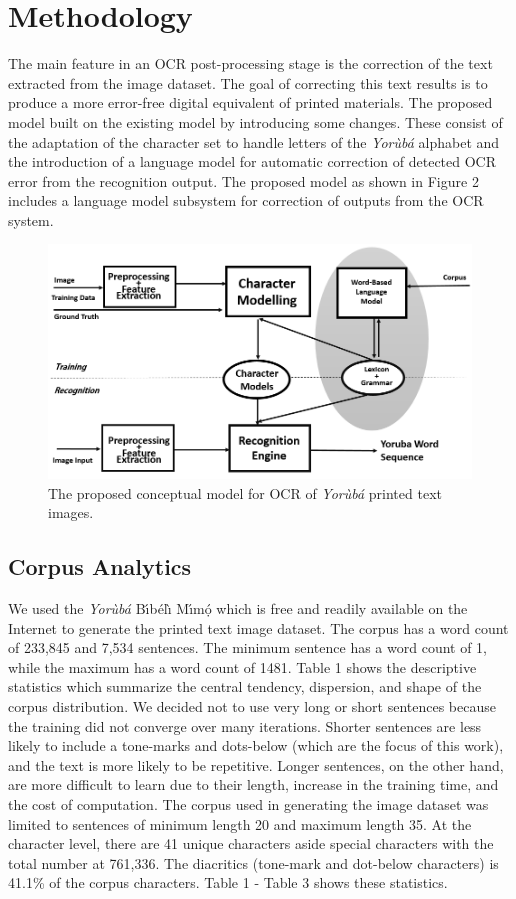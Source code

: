 \documentclass[review]{elsarticle}
\newcommand{\yor}{\textit{Yor\`ub\'a }}
\begin{document}
\section{Methodology}
The main feature in an OCR post-processing stage is the correction of the text extracted from the image dataset. The goal of correcting this text results is to produce a more error-free digital equivalent of printed materials. The proposed model built on the existing model by introducing some changes. These consist of the adaptation of the character set to handle letters of the \yor alphabet and the introduction of a language model for automatic correction of detected OCR error from the recognition output. The proposed model as shown in Figure 2 includes a language model subsystem for correction of outputs from the OCR system. 

\begin{figure}[h]
\centering
\includegraphics[width=0.8\linewidth, height=0.3\textheight]{proposedmodel}
\caption{The proposed conceptual model for OCR of \yor printed text images.}
\label{fig:proposedmodel}
\end{figure}

\subsection{Corpus Analytics}

We used the \yor B\'{\i}b\'{e}l\`{\i} M\'{\i}m\d{\'{o}} which is free and readily available on the Internet to generate the printed text image dataset. The corpus has a word count of 233,845 and 7,534 sentences. The minimum sentence has a word count of 1, while the maximum has a word count of 1481. Table 1 shows the descriptive statistics which summarize the central tendency, dispersion, and shape of the corpus distribution. We decided not to use very long or short sentences because the training did not converge over many iterations. Shorter sentences are less likely to include a tone-marks and dots-below (which are the focus of this work), and the text is more likely to be repetitive. Longer sentences, on the other hand, are more difficult to learn due to their length, increase in the training time, and the cost of computation. The corpus used in generating the image dataset was limited to sentences of minimum length 20 and maximum length 35. At the character level, there are 41 unique characters aside special characters with the total number at 761,336. The diacritics (tone-mark and dot-below characters) is 41.1\% of the corpus characters. Table 1 - Table 3 shows these statistics.
\end{document}
